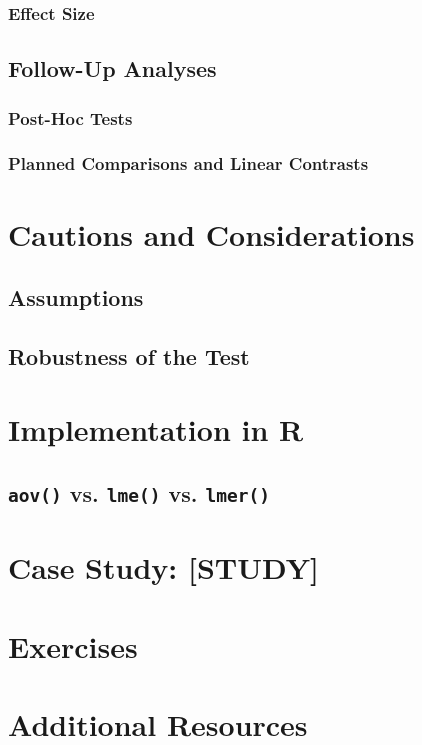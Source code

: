 \subsubsection{Effect Size}

\subsection{Follow-Up Analyses}

\subsubsection{Post-Hoc Tests}

\subsubsection{Planned Comparisons and Linear Contrasts}

\section{Cautions and Considerations}

\subsection{Assumptions}

\subsection{Robustness of the Test}

\section{Implementation in R}

\subsection{\verb|aov()| vs. \verb|lme()| vs. \verb|lmer()|}

\section{Case Study: [STUDY]}

\section{Exercises}

\section{Additional Resources}

